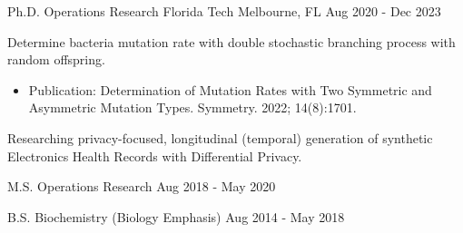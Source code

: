 \vspace{-4mm}
\vspace{-2mm}

\begin{cventries}

	\cventry
	{Ph.D. Operations Research}
	{Florida Tech}
	{Melbourne, FL}
	{Aug 2020 - Dec 2023}
	{\begin{cvitems}
			\item {Determine bacteria mutation rate with double stochastic branching process with random offspring.
			            \begin{itemize}
				            \item {Publication: Determination of Mutation Rates with Two Symmetric and Asymmetric Mutation Types. Symmetry. 2022; 14(8):1701.}
			            \end{itemize}}
			\item {Researching privacy-focused, longitudinal (temporal) generation of synthetic Electronics Health Records with Differential Privacy.}
		\end{cvitems}}

	\vspace{-2mm}

	\cventry
	{M.S. Operations Research}
	{}
	{}
	{Aug 2018 - May 2020}
	{}
	\vspace{-7mm}

	\cventry
	{B.S. Biochemistry (Biology Emphasis)}
	{}
	{}
	{Aug 2014 - May 2018}
	{}
	\vspace{-7mm}

\end{cventries}